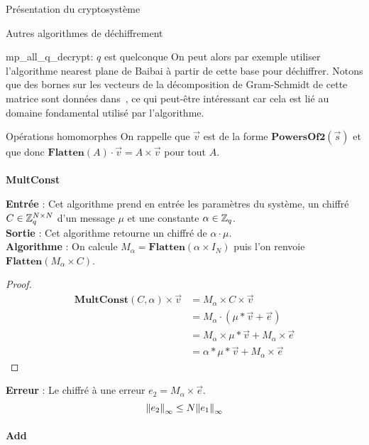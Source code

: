 \begin{section}{Présentation du cryptosystème}
\begin{subsection}{Autres algorithmes de déchiffrement}
\begin{subsubsection}{mp\_all\_q\_decrypt: $q$ est quelconque}
On peut alors par exemple utiliser l'algorithme nearest plane de Baibai 
à partir de cette base pour déchiffrer. Notons que des bornes sur 
les vecteurs de la décomposition de Gram-Schmidt de cette matrice sont données
dans~\cite{EC:MicPei12}, ce qui peut-être intéressant car cela est lié 
au domaine fondamental utilisé par l'algorithme.

\end{subsubsection}

	
\end{subsection}
	\begin{subsection}{Opérations homomorphes}
	On rappelle que $\vec{v}$ est de la forme $\textbf{PowersOf2}(\vec{s})$ et que donc $\textbf{Flatten}(A) \cdot \vec{v} = A \times \vec{v}$ pour tout $A$.
	
	\paragraph{}
	\textbf{MultConst}
	\flushleft
	
	\textbf{Entrée} : Cet algorithme prend en entrée les paramètres du système, un chiffré $C \in \mathbb{Z}_q^{N \times N}$ d'un message $\mu$ et une constante $\alpha \in \mathbb{Z}_q$. \\
	\textbf{Sortie} : Cet algorithme retourne un chiffré de $\alpha \cdot \mu$.\\
	\textbf{Algorithme} : On calcule $M_{\alpha} = \textbf{Flatten}(\alpha \times I_N)$ puis l'on renvoie $\textbf{Flatten}(M_{\alpha} \times C)$.
	\begin{proof}
	\begin{align*}
	\textbf{MultConst}(C, \alpha) \times \vec{v} &= M_{\alpha} \times C \times \vec{v} \\
	&= M_{\alpha} \cdot (\mu * \vec{v} + \vec{e}) \\
	&= M_{\alpha} \times \mu * \vec{v} + M_{\alpha} \times \vec{e} \\
	&= \alpha * \mu * \vec{v} + M_{\alpha} \times \vec{e}
	\end{align*}
	\end{proof}
	\textbf{Erreur} : Le chiffré à une erreur $e_2 = M_\alpha \times
		\vec{e}$. 
		\[{\|e_2\|}_{\infty} \leq N {\|e_1\|}_{\infty}\]
	\paragraph{}
	\textbf{Add}
	\flushleft
	

\end{subsection}
\end{section}
